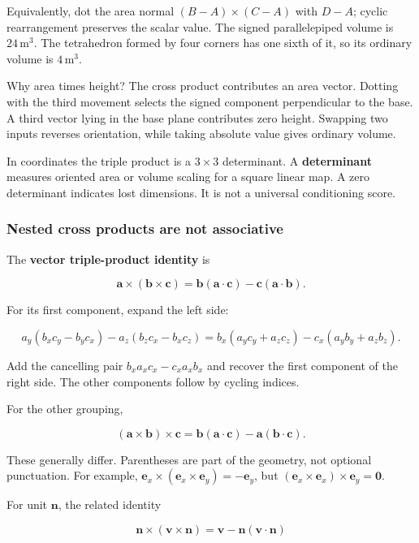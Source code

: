 Equivalently, dot the area normal \((B-A)\times(C-A)\) with \(D-A\); cyclic rearrangement preserves the scalar value. The signed parallelepiped volume is \(24\,\mathrm{m}^3\). The tetrahedron formed by four corners has one sixth of it, so its ordinary volume is \(4\,\mathrm{m}^3\).

Why area times height? The cross product contributes an area vector. Dotting with the third movement selects the signed component perpendicular to the base. A third vector lying in the base plane contributes zero height. Swapping two inputs reverses orientation, while taking absolute value gives ordinary volume.

In coordinates the triple product is a \(3\times3\) determinant. A \textbf{determinant} measures oriented area or volume scaling for a square linear map. A zero determinant indicates lost dimensions. It is not a universal conditioning score.

\subsubsection{Nested cross products are not associative}\label{nested-cross-products-are-not-associative}

The \textbf{vector triple-product identity} is

\[
\mathbf a\times(\mathbf b\times\mathbf c)
=\mathbf b(\mathbf a\cdot\mathbf c)-\mathbf c(\mathbf a\cdot\mathbf b).
\]

For its first component, expand the left side:

\[
a_y(b_xc_y-b_yc_x)-a_z(b_zc_x-b_xc_z)
=b_x(a_yc_y+a_zc_z)-c_x(a_yb_y+a_zb_z).
\]

Add the cancelling pair \(b_xa_xc_x-c_xa_xb_x\) and recover the first component of the right side. The other components follow by cycling indices.

For the other grouping,

\[
(\mathbf a\times\mathbf b)\times\mathbf c
=\mathbf b(\mathbf a\cdot\mathbf c)-\mathbf a(\mathbf b\cdot\mathbf c).
\]

These generally differ. Parentheses are part of the geometry, not optional punctuation. For example, \(\mathbf e_x\times(\mathbf e_x\times\mathbf e_y)=-\mathbf e_y\), but \((\mathbf e_x\times\mathbf e_x)\times\mathbf e_y=\mathbf0\).

For unit \(\mathbf n\), the related identity

\[
\mathbf n\times(\mathbf v\times\mathbf n)
=\mathbf v-\mathbf n(\mathbf v\cdot\mathbf n)
\]

